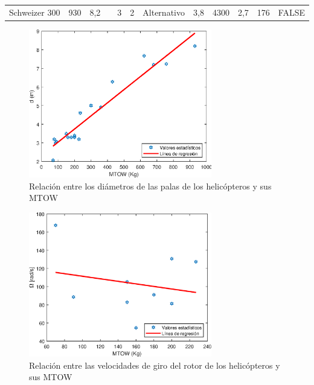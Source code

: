 \begin{table}[htbp]
\begin{tabular}{|c|r|r|r|r|r|l|r|r|r|r|l|}
		\midrule
		\rowcolor[rgb]{ .329,  .506,  .208} \textcolor[rgb]{ 1,  1,  1}{Schweizer 300} & \cellcolor[rgb]{ .659,  .816,  .553}930 & \cellcolor[rgb]{ .659,  .816,  .553}8,2 & \cellcolor[rgb]{ 1,  1,  0} & \cellcolor[rgb]{ .659,  .816,  .553}3 & \cellcolor[rgb]{ .659,  .816,  .553}2 & \cellcolor[rgb]{ .659,  .816,  .553}Alternativo & \cellcolor[rgb]{ .659,  .816,  .553}3,8 & \cellcolor[rgb]{ .659,  .816,  .553}4300 & \cellcolor[rgb]{ .659,  .816,  .553}2,7 & \cellcolor[rgb]{ .659,  .816,  .553}176 & \cellcolor[rgb]{ .659,  .816,  .553}FALSE \\
	\end{tabular}%
	\label{tab:addlabel}%
\end{table}%


\begin{figure}
	\centering
	\includegraphics[width=80mm]{graficos/anald}
	\caption{Relación entre los diámetros de las palas de los helicópteros y sus MTOW}
\end{figure}
\begin{figure}
	\centering
	\includegraphics[width=80mm]{graficos/analomega}
	\caption{Relación entre las velocidades de giro del rotor de los helicópteros y sus MTOW}
\end{figure}
